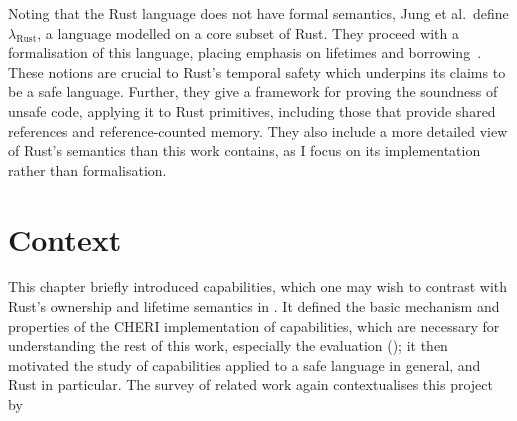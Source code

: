 \documentclass[dissertation.tex]{subfiles}
\begin{document}
Noting that the Rust language does not have formal semantics, Jung et
al.\ define \(\lambda_\textrm{Rust}\), a language modelled on a core
subset of Rust.
They proceed with a formalisation of this language, placing emphasis on
lifetimes and borrowing~\cite{jung-rustbelt}.
These notions are crucial to Rust's temporal safety which underpins
its claims to be a safe language.
Further, they give a framework for proving the soundness of unsafe code,
applying it to Rust primitives, including those that provide shared
references and reference-counted memory.
They also include a more detailed view of Rust's semantics than this
work contains, as I focus on its implementation rather than
formalisation.


\section{Context}
This chapter briefly introduced capabilities, which one may wish to
contrast with Rust's ownership and lifetime semantics in
.
It defined the basic mechanism and properties of the CHERI
implementation of capabilities, which are necessary for understanding
the rest of this work, especially the evaluation ();
it then motivated the study of capabilities applied to a safe language
in general, and Rust in particular.
The survey of related work again contextualises this project by 
\end{document}
